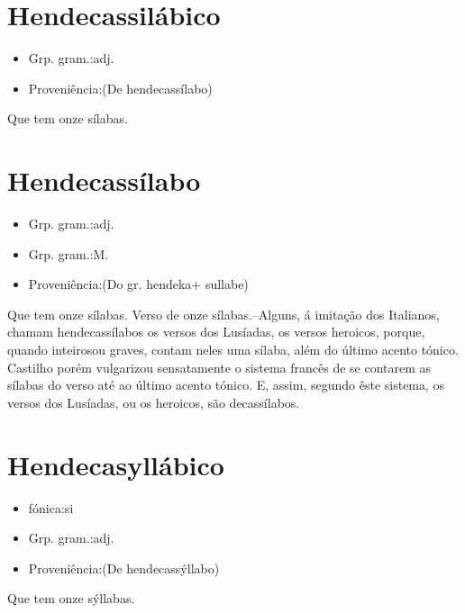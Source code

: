 \documentclass{article}
\begin{document}
\section{Hendecassilábico}
\begin{itemize}
\item {Grp. gram.:adj.}
\end{itemize}
\begin{itemize}
\item {Proveniência:(De \textunderscore hendecassílabo\textunderscore )}
\end{itemize}
Que tem onze sílabas.
\section{Hendecassílabo}
\begin{itemize}
\item {Grp. gram.:adj.}
\end{itemize}
\begin{itemize}
\item {Grp. gram.:M.}
\end{itemize}
\begin{itemize}
\item {Proveniência:(Do gr. \textunderscore hendeka\textunderscore  + \textunderscore sullabe\textunderscore )}
\end{itemize}
Que tem onze sílabas.
Verso de onze sílabas.--Alguns, á imitação dos Italianos, chamam hendecassílabos os versos dos \textunderscore Lusíadas\textunderscore , os versos heroicos, porque, quando \textunderscore inteiros\textunderscore  ou \textunderscore graves\textunderscore , contam neles uma sílaba, além do último acento tónico. Castilho porém vulgarizou sensatamente o sistema francês de se contarem as sílabas do verso até ao último acento tónico. E, assim, segundo êste sistema, os versos dos \textunderscore Lusíadas\textunderscore , ou os \textunderscore heroicos\textunderscore , são decassílabos.
\section{Hendecasyllábico}
\begin{itemize}
\item {fónica:si}
\end{itemize}
\begin{itemize}
\item {Grp. gram.:adj.}
\end{itemize}
\begin{itemize}
\item {Proveniência:(De \textunderscore hendecassýllabo\textunderscore )}
\end{itemize}
Que tem onze sýllabas.
\end{document}
